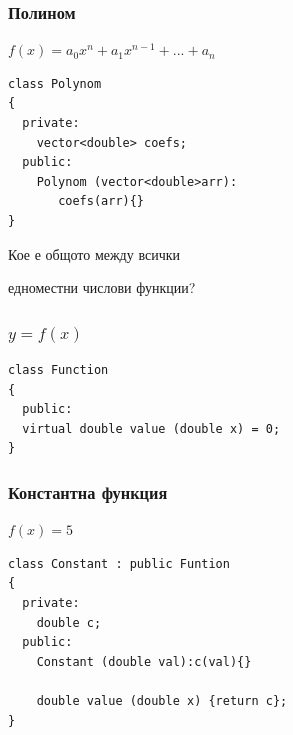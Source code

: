 \documentclass{beamer}
\begin{document}
\begin{frame}[fragile]
\frametitle{Полином}

\begin{center}

$f(x) = a_0x^n + a_1x^{n-1}+...+a_n$

\begin{lstlisting}
class Polynom
{
  private:
    vector<double> coefs;
  public:
    Polynom (vector<double>arr):
       coefs(arr){}
}
\end{lstlisting}

\end{center}


\end{frame}


\begin{frame}
\centerline{Кое е общото между всички}
\centerline{едноместни числови функции?}
\end{frame}



\begin{frame}[fragile]
\frametitle{$y=f(x)$}

\begin{center}

\begin{lstlisting}
class Function
{
  public:
  virtual double value (double x) = 0;
}
\end{lstlisting}

\end{center}


\end{frame}



\begin{frame}[fragile]
\frametitle{Константна функция}

\begin{center}

$f(x) = 5$

\begin{lstlisting}
class Constant : public Funtion
{
  private:
    double c;
  public:
    Constant (double val):c(val){}

    double value (double x) {return c};
}
\end{lstlisting}

\end{center}


\end{frame}
\end{document}
